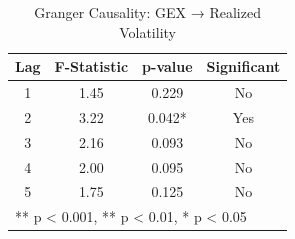 \begin{table}[htbp]
\centering
\caption{Granger Causality: GEX → Realized Volatility}
\label{tab:granger}
\begin{tabular}{cccc}
\toprule
Lag & F-Statistic & p-value & Significant \\
\midrule
1 & 1.45 & 0.229 & No \\
2 & 3.22 & 0.042* & Yes \\
3 & 2.16 & 0.093 & No \\
4 & 2.00 & 0.095 & No \\
5 & 1.75 & 0.125 & No \\
\bottomrule
\multicolumn{4}{l}{\footnotesize *** p < 0.001, ** p < 0.01, * p < 0.05}
\end{tabular}
\end{table}